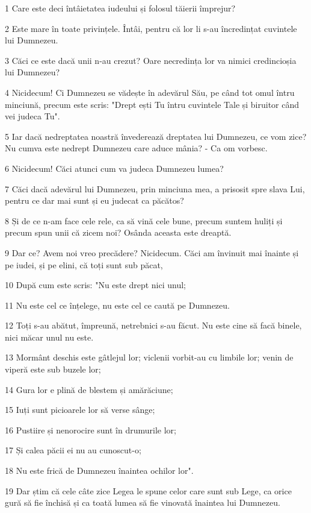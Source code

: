 \par 1 Care este deci întâietatea iudeului și folosul tăierii împrejur?
\par 2 Este mare în toate privințele. Întâi, pentru că lor li s-au încredințat cuvintele lui Dumnezeu.
\par 3 Căci ce este dacă unii n-au crezut? Oare necredința lor va nimici credincioșia lui Dumnezeu?
\par 4 Nicidecum! Ci Dumnezeu se vădește în adevărul Său, pe când tot omul întru minciună, precum este scris: "Drept ești Tu întru cuvintele Tale și biruitor când vei judeca Tu".
\par 5 Iar dacă nedreptatea noastră învederează dreptatea lui Dumnezeu, ce vom zice? Nu cumva este nedrept Dumnezeu care aduce mânia? - Ca om vorbesc.
\par 6 Nicidecum! Căci atunci cum va judeca Dumnezeu lumea?
\par 7 Căci dacă adevărul lui Dumnezeu, prin minciuna mea, a prisosit spre slava Lui, pentru ce dar mai sunt și eu judecat ca păcătos?
\par 8 Și de ce n-am face cele rele, ca să vină cele bune, precum suntem huliți și precum spun unii că zicem noi? Osânda aceasta este dreaptă.
\par 9 Dar ce? Avem noi vreo precădere? Nicidecum. Căci am învinuit mai înainte și pe iudei, și pe elini, că toți sunt sub păcat,
\par 10 După cum este scris: "Nu este drept nici unul;
\par 11 Nu este cel ce înțelege, nu este cel ce caută pe Dumnezeu.
\par 12 Toți s-au abătut, împreună, netrebnici s-au făcut. Nu este cine să facă binele, nici măcar unul nu este.
\par 13 Mormânt deschis este gâtlejul lor; viclenii vorbit-au cu limbile lor; venin de viperă este sub buzele lor;
\par 14 Gura lor e plină de blestem și amărăciune;
\par 15 Iuți sunt picioarele lor să verse sânge;
\par 16 Pustiire și nenorocire sunt în drumurile lor;
\par 17 Și calea păcii ei nu au cunoscut-o;
\par 18 Nu este frică de Dumnezeu înaintea ochilor lor".
\par 19 Dar știm că cele câte zice Legea le spune celor care sunt sub Lege, ca orice gură să fie închisă și ca toată lumea să fie vinovată înaintea lui Dumnezeu.
